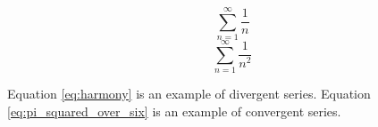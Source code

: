 \documentclass{article}
\begin{document}
\begin{equation} \label{eq:harmony}
  \sum_{n=1}^{\infty} \frac{1}{n}
\end{equation}
\begin{equation} \label{eq:pi_squared_over_six}
  \sum_{n=1}^{\infty} \frac{1}{n^2}
\end{equation}

Equation \ref{eq:harmony} is an example of divergent
series. Equation \ref{eq:pi_squared_over_six} is an
example of convergent series.
\end{document}
